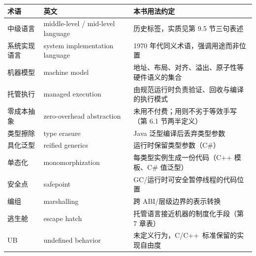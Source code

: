 \documentclass[12pt,a4paper,fontset=fandol]{ctexbook}
\newcommand{\Cplus}[1]{C++\,#1}
\begin{document}
{\footnotesize
\begin{longtable}{@{}p{}p{}p{}@{}}
\toprule
\textbf{术语} & \textbf{英文} & \textbf{本书用法约定} \\
\midrule
中级语言 & middle-level / mid-level language & 历史标签，实质见第 9.5 节三句表述 \\
系统实现语言 & system implementation language & 1970 年代同义术语，强调用途而非位置 \\
机器模型 & machine model & 地址、布局、对齐、溢出、原子性等硬件语义的集合 \\
托管执行 & managed execution & 由规范运行时负责验证、回收与编译的执行模式 \\
零成本抽象 & zero-overhead abstraction & 未用不付费；用则不劣于等效手写（第 6.1 节两半定义） \\
类型擦除 & type erasure & Java 泛型编译后丢弃类型参数 \\
具化泛型 & reified generics & 运行时保留类型参数（C\#） \\
单态化 & monomorphization & 每类型实例生成一份代码（C++ 模板、C\# 值泛型） \\
安全点 & safepoint & GC/运行时可安全暂停线程的代码位置 \\
编组 & marshalling & 跨 ABI/层级边界的表示转换 \\
逃生舱 & escape hatch & 托管语言接近机器的制度化手段（第 7 章表） \\
UB & undefined behavior & 未定义行为，C/\allowbreak{}\Cplus{} 标准保留的实现自由度 \\
\bottomrule
\end{longtable}
}
\end{document}
